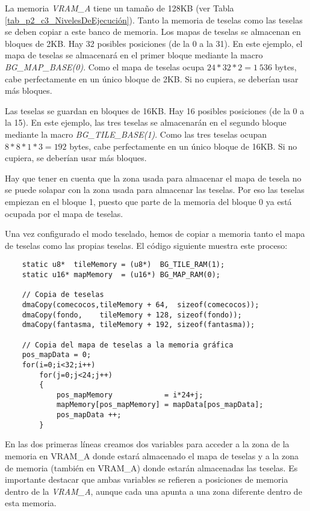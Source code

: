 La memoria \textit{VRAM\_A} tiene un tamaño de 128KB (ver Tabla \ref{tab_p2_c3_NivelesDeEjecución}). Tanto la memoria de teselas como las teselas se deben copiar a este banco de memoria. Los mapas de teselas se almacenan en bloques de 2KB. Hay 32 posibles posiciones (de la 0 a la 31). En este ejemplo, el mapa de teselas se almacenará en el primer bloque mediante la macro \textit{BG\_MAP\_BASE(0)}. Como el mapa de teselas ocupa $24*32*2 = 1\ 536$ bytes, cabe perfectamente en un único bloque de 2KB. Si no cupiera, se deberían usar más bloques.

Las teselas se guardan en bloques de 16KB. Hay 16 posibles posiciones (de la 0 a la 15). En este ejemplo, las tres teselas se almacenarán en el segundo bloque mediante la macro \textit{BG\_TILE\_BASE(1)}. Como las tres teselas ocupan $8*8*1*3 = 192$ bytes, cabe perfectamente en un único bloque de 16KB. Si no cupiera, se deberían usar más bloques. 

Hay que tener en cuenta que la zona usada para almacenar el mapa de tesela no se puede solapar con la zona usada para almacenar las teselas. Por eso las teselas empiezan en el bloque 1, puesto que parte de la memoria del bloque 0 ya está ocupada por el mapa de teselas.

Una vez configurado el modo teselado, hemos de copiar a memoria tanto el mapa de teselas como las propias teselas. El código siguiente muestra este proceso:

\begin{lstlisting}
	static u8*  tileMemory = (u8*)  BG_TILE_RAM(1);
	static u16* mapMemory  = (u16*) BG_MAP_RAM(0);

	// Copia de teselas
	dmaCopy(comecocos,tileMemory + 64,  sizeof(comecocos));
	dmaCopy(fondo,    tileMemory + 128, sizeof(fondo));
	dmaCopy(fantasma, tileMemory + 192, sizeof(fantasma));

	// Copia del mapa de teselas a la memoria gráfica
	pos_mapData = 0;
	for(i=0;i<32;i++)
		for(j=0;j<24;j++)
		{
			pos_mapMemory            = i*24+j;
			mapMemory[pos_mapMemory] = mapData[pos_mapData];
			pos_mapData ++;
		}
\end{lstlisting}

En las dos primeras líneas creamos dos variables para acceder a la zona de la memoria en VRAM\_A donde estará almacenado el mapa de teselas y a la zona de memoria (también en VRAM\_A) donde estarán almacenadas las teselas. Es importante destacar que ambas variables se refieren a posiciones de memoria dentro de la \textit{VRAM\_A}, aunque cada una apunta a una zona diferente dentro de esta memoria.

